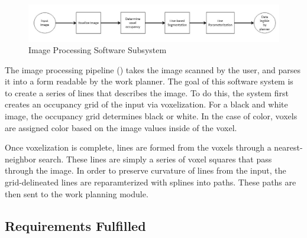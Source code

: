 \begin{figure}[h!]
 \centering
  \includegraphics[width=0.99\columnwidth]{diagrams/sw_arch_image_processing.jpg}
	\caption{Image Processing Software Subsystem}
 \label{fig:image_processing}
\end{figure}

The image processing pipeline () takes the image scanned by the user, and parses it into a form readable by the work planner. The goal of this software system is to create a series of lines that describes the image. To do this, the system first creates an occupancy grid of the input via voxelization. For a black and white image, the occupancy grid determines black or white. In the case of color, voxels are assigned color based on the image values inside of the voxel.

Once voxelization is complete, lines are formed from the voxels through a nearest-neighbor search. These lines are simply a series of voxel squares that pass through the image. In order to preserve curvature of lines from the input, the grid-delineated lines are reparamterized with splines into paths. These paths are then sent to the work planning module.

\subsection{Requirements Fulfilled}
\label{subsec:image_processing_req_fulfilled}
